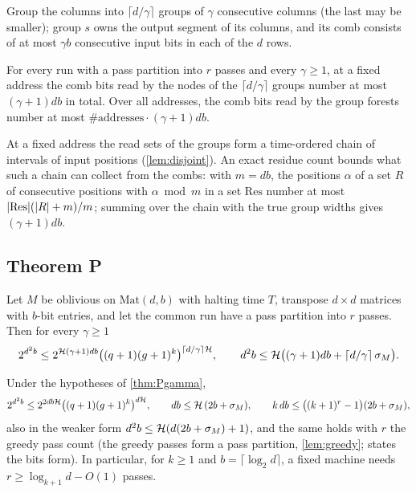 Group the columns into $\lceil d/\gamma\rceil$ groups of $\gamma$ consecutive columns (the last may be
smaller); group $s$ owns the output segment of its columns, and its comb consists of at most $\gamma b$
consecutive input bits in each of the $d$ rows.

\begin{lemma}[Coverage]\label{lem:coverage}
For every run with a pass partition into $r$ passes and every $\gamma\ge1$, at a fixed address the comb
bits read by the nodes of the $\lceil d/\gamma\rceil$ groups number at most $(\gamma+1)db$ in total.
Over all addresses, the comb bits read by the group forests number at most
$\#\mathrm{addresses}\cdot(\gamma+1)db$.
\end{lemma}

\begin{outline}
At a fixed address the read sets of the groups form a time-ordered chain of intervals of input
positions (\cref{lem:disjoint}). An exact residue count bounds what such a chain can collect from
the combs: with $m=db$, the positions $\alpha$ of a set $R$ of consecutive positions with $\alpha\bmod m$ in
a set $\mathrm{Res}$ number at most $\lvert \mathrm{Res} \rvert(\lvert R \rvert+m)/m$; summing over the chain with
the true group widths gives $(\gamma+1)db$.
\end{outline}

\subsection{Theorem P}

\begin{theorem}\label{thm:Pgamma}
Let $M$ be oblivious on $\mathrm{Mat}(d,b)$ with halting time $T$, transpose $d\times d$ matrices
with $b$-bit entries, and let the common run have a pass partition into $r$ passes. Then for every
$\gamma\ge1$
\[
  2^{d^2b}\le 2^{\mathcal{H}(\gamma+1)db}\bigl((q+1)(g+1)^k\bigr)^{\lceil d/\gamma\rceil\mathcal{H}},
  \qquad
  d^2b\le\mathcal{H}\bigl((\gamma+1)db+\lceil d/\gamma\rceil\,\sigma_M\bigr).
\]
\end{theorem}

\begin{theorem}[Theorem P]\label{thm:P}
Under the hypotheses of \cref{thm:Pgamma},
\[
  2^{d^2b}\le 2^{2db\mathcal{H}}\bigl((q+1)(g+1)^k\bigr)^{d\mathcal{H}},\qquad
  db\le\mathcal{H}\,(2b+\sigma_M),\qquad
  k\,db\le\bigl((k+1)^r-1\bigr)(2b+\sigma_M),
\]
also in the weaker form $d^2b\le\mathcal{H}(d(2b+\sigma_M)+1)$, and the same holds with $r$ the greedy pass
count (the greedy passes form a pass partition,
\cref{lem:greedy};  states the bits form). In particular, for $k\ge1$ and
$b=\lceil\log_2d\rceil$, a fixed machine needs $r\ge\log_{k+1}d-O(1)$ passes.
\end{theorem}

